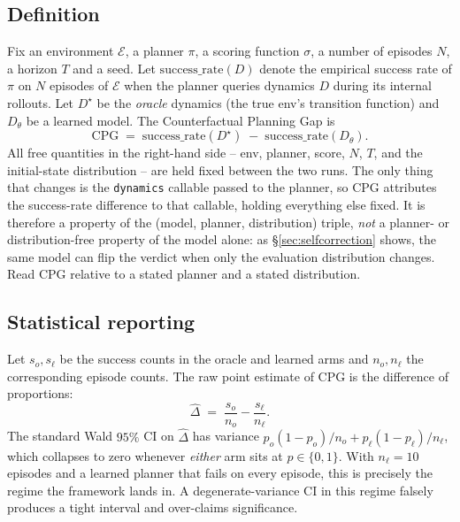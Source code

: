 \documentclass[10pt,letterpaper]{article}
\begin{document}
\subsection{Definition}

Fix an environment $\mathcal{E}$, a planner $\pi$, a scoring function $\sigma$, a number of episodes $N$, a horizon $T$ and a seed. Let $\mathrm{success\_rate}(D)$ denote the empirical success rate of $\pi$ on $N$ episodes of $\mathcal{E}$ when the planner queries dynamics $D$ during its internal rollouts. Let $D^{\star}$ be the \emph{oracle} dynamics (the true env's transition function) and $D_\theta$ be a learned model. The Counterfactual Planning Gap is
\begin{equation}
  \mathrm{CPG} \;=\; \mathrm{success\_rate}(D^{\star}) \;-\; \mathrm{success\_rate}(D_\theta).
  \label{eq:cpg}
\end{equation}
All free quantities in the right-hand side -- env, planner, score, $N$, $T$, and the initial-state distribution -- are held fixed between the two runs. The only thing that changes is the \texttt{dynamics} callable passed to the planner, so CPG attributes the success-rate difference to that callable, holding everything else fixed. It is therefore a property of the (model, planner, distribution) triple, \emph{not} a planner- or distribution-free property of the model alone: as \S\ref{sec:selfcorrection} shows, the same model can flip the verdict when only the evaluation distribution changes. Read CPG relative to a stated planner and a stated distribution.

\subsection{Statistical reporting}

Let $s_o, s_\ell$ be the success counts in the oracle and learned arms and $n_o, n_\ell$ the corresponding episode counts. The raw point estimate of CPG is the difference of proportions:
\begin{equation}
  \hat{\Delta} \;=\; \frac{s_o}{n_o} - \frac{s_\ell}{n_\ell}.
\end{equation}
The standard Wald $95\%$ CI on $\hat\Delta$ has variance $p_o(1-p_o)/n_o + p_\ell(1-p_\ell)/n_\ell$, which collapses to zero whenever \emph{either} arm sits at $p \in \{0, 1\}$. With $n_\ell = 10$ episodes and a learned planner that fails on every episode, this is precisely the regime the framework lands in. A degenerate-variance CI in this regime falsely produces a tight interval and over-claims significance.
\end{document}
